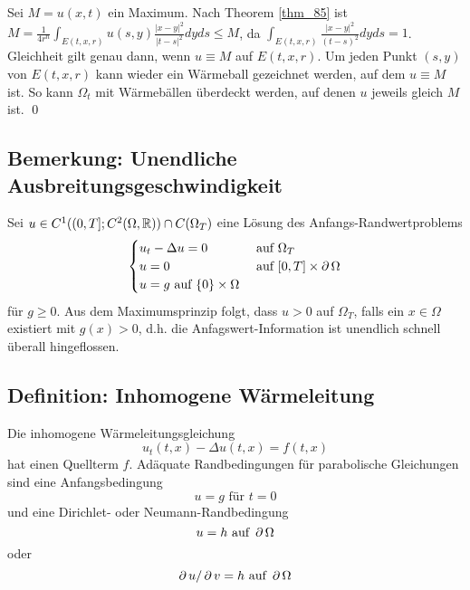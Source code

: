 	Sei $M = u(x,t)$  ein Maximum. Nach Theorem \ref{thm_85} ist $M = \frac{1}{4r^n} \int_{E(t,x,r)} u(s,y) \frac{|x-y|^2}{|t-s|^2} dyds \leq M$, da \linebreak $\int_{E(t,x,r)} \frac{|x-y|^2}{(t-s)^2} dyds = 1$. Gleichheit gilt genau dann, wenn $u \equiv M$ auf $E(t,x,r)$. Um jeden Punkt $(s,y)$ von $E(t,x,r)$ kann wieder ein Wärmeball gezeichnet werden, auf dem $u \equiv M$ ist. So kann $\Omega_t$ mit Wärmebällen überdeckt werden, auf denen $u$ jeweils gleich $M$ ist. \qed

\subsection{Bemerkung: Unendliche Ausbreitungsgeschwindigkeit}
\label{bem_87}
	Sei $u \in C^1((0,T];C^2(\Omega,\mathbb{R})) \cap C(\Omega_T)$ eine Lösung des Anfangs-Randwertproblems \marginnote{[87]}
	\[ \begin{cases}
		u_t - \Delta u = 0 & \text{ auf } \Omega_T \\
		u = 0 & \text{ auf } [0,T] \times \operatorname{\partial} \Omega \\
		u = g \text{ auf } \{0\} \times \Omega \end{cases} \]
	für $g \geq 0$. Aus dem Maximumsprinzip folgt, dass $u > 0$ auf $\Omega_T$, falls ein $x \in \Omega$ existiert mit $g(x) > 0$, d.h. die Anfagswert-Information ist unendlich schnell überall hingeflossen.
	
\subsection{Definition: Inhomogene Wärmeleitung}
	Die inhomogene Wärmeleitungsgleichung
	\begin{equation}
		u_t(t,x) - \Delta u(t,x) = f(t,x) \label{eq_34}
	\end{equation}
	hat einen Quellterm $f$. Adäquate Randbedingungen für parabolische Gleichungen sind eine Anfangsbedingung
	\begin{equation}
		u=g \text{ für } t = 0 \label{eq_35}
	\end{equation}
	und eine Dirichlet- oder Neumann-Randbedingung
	\begin{equation}
		u = h \text{ auf } \operatorname{\partial} \Omega \label{eq_36}
	\end{equation}
	oder
	\begin{equation}
		\operatorname{\partial} u / \operatorname{\partial} v = h \text{ auf } \operatorname{\partial} \Omega \label{eq_37}
	\end{equation}

